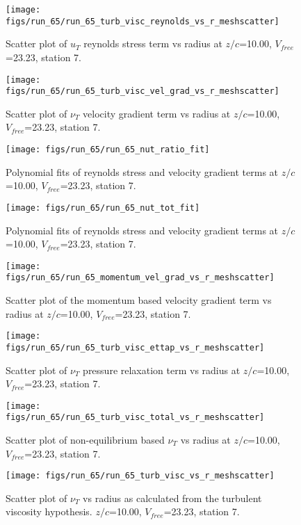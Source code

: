 \begin{figure}[H]
\centering
\texttt{[image: figs/run\_65/run\_65\_turb\_visc\_reynolds\_vs\_r\_meshscatter]}
\caption{Scatter plot of $
u_T$ reynolds stress term vs radius at $z/c$=10.00, $V_{free}$=23.23, station 7.}
\end{figure}


\begin{figure}[H]
\centering
\texttt{[image: figs/run\_65/run\_65\_turb\_visc\_vel\_grad\_vs\_r\_meshscatter]}
\caption{Scatter plot of $\nu_T$ velocity gradient term vs radius at $z/c$=10.00, $V_{free}$=23.23, station 7.}
\end{figure}


\begin{figure}[H]
\centering
\texttt{[image: figs/run\_65/run\_65\_nut\_ratio\_fit]}
\caption{Polynomial fits of reynolds stress and velocity gradient terms at $z/c$=10.00, $V_{free}$=23.23, station 7.}
\end{figure}


\begin{figure}[H]
\centering
\texttt{[image: figs/run\_65/run\_65\_nut\_tot\_fit]}
\caption{Polynomial fits of reynolds stress and velocity gradient terms at $z/c$=10.00, $V_{free}$=23.23, station 7.}
\end{figure}


\begin{figure}[H]
\centering
\texttt{[image: figs/run\_65/run\_65\_momentum\_vel\_grad\_vs\_r\_meshscatter]}
\caption{Scatter plot of the momentum based velocity gradient term vs radius at $z/c$=10.00, $V_{free}$=23.23, station 7.}
\end{figure}


\begin{figure}[H]
\centering
\texttt{[image: figs/run\_65/run\_65\_turb\_visc\_ettap\_vs\_r\_meshscatter]}
\caption{Scatter plot of $\nu_T$ pressure relaxation term vs radius at $z/c$=10.00, $V_{free}$=23.23, station 7.}
\end{figure}


\begin{figure}[H]
\centering
\texttt{[image: figs/run\_65/run\_65\_turb\_visc\_total\_vs\_r\_meshscatter]}
\caption{Scatter plot of non-equilibrium based $\nu_T$ vs radius at $z/c$=10.00, $V_{free}$=23.23, station 7.}
\end{figure}


\begin{figure}[H]
\centering
\texttt{[image: figs/run\_65/run\_65\_turb\_visc\_vs\_r\_meshscatter]}
\caption{Scatter plot of $\nu_T$ vs radius as calculated from the turbulent viscosity hypothesis. $z/c$=10.00, $V_{free}$=23.23, station 7.}
\end{figure}


